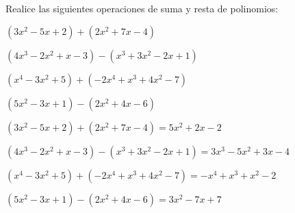 \begin{exercise}
\problem Realice las siguientes operaciones de suma y resta de polinomios:

\begin{exerciselist}
    \item $(3x^2 - 5x + 2) + (2x^2 + 7x - 4)$
    \item $(4x^3 - 2x^2 + x - 3) - (x^3 + 3x^2 - 2x + 1)$
    \item $(x^4 - 3x^2 + 5) + (-2x^4 + x^3 + 4x^2 - 7)$
    \item $(5x^2 - 3x + 1) - (2x^2 + 4x - 6)$
\end{exerciselist}

\begin{solucion}
\begin{exerciselist}
    \item $(3x^2 - 5x + 2) + (2x^2 + 7x - 4) = 5x^2 + 2x - 2$
    
    \item $(4x^3 - 2x^2 + x - 3) - (x^3 + 3x^2 - 2x + 1) = 3x^3 - 5x^2 + 3x - 4$
    
    \item $(x^4 - 3x^2 + 5) + (-2x^4 + x^3 + 4x^2 - 7) = -x^4 + x^3 + x^2 - 2$
    
    \item $(5x^2 - 3x + 1) - (2x^2 + 4x - 6) = 3x^2 - 7x + 7$
\end{exerciselist}
\end{solucion}
\end{exercise}

